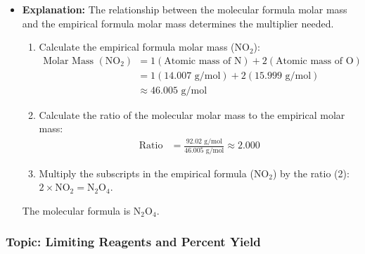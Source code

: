 \documentclass{article}
\begin{document}
\begin{itemize}
    \item \textbf{Explanation:} The relationship between the molecular formula molar mass and the empirical formula molar mass determines the multiplier needed.
    \begin{enumerate}
        \item Calculate the empirical formula molar mass ($\text{NO}_2$):
        \begin{align*}
            \text{Molar Mass } (\text{NO}_2) &= 1(\text{Atomic mass of N}) + 2(\text{Atomic mass of O}) \\
            &= 1(14.007 \text{ g/mol}) + 2(15.999 \text{ g/mol}) \\
            &\approx 46.005 \text{ g/mol}
        \end{align*}
        \item Calculate the ratio of the molecular molar mass to the empirical molar mass:
        \begin{align*}
            \text{Ratio} &= \frac{92.02 \text{ g/mol}}{46.005 \text{ g/mol}} \approx 2.000
        \end{align*}
        \item Multiply the subscripts in the empirical formula ($\text{NO}_2$) by the ratio (2): $2 \times \text{NO}_2 = \text{N}_2\text{O}_4$.
    \end{enumerate}
    The molecular formula is \textbf{$\text{N}_2\text{O}_4$}.

\end{itemize}

\bigskip %

\subsubsection*{Topic: Limiting Reagents and Percent Yield}
\end{document}
